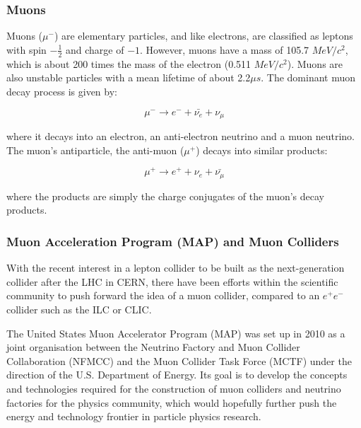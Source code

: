 \cite{Muon:WhitePaper}
\cite{Muon:Geer}
\cite{Muon:Collide}
\cite{Muon:Nature}
\cite{Muon:CERNCourier}
\cite{Muon:ProtonBeam}
\cite{Muon:Feasibility}
\cite{Muon:MICE}
\cite{Muon:PDG}

\subsubsection{Muons}

Muons ($\mu^-$) are elementary particles, and like electrons, are classified as leptons with spin $-\frac{1}{2}$ and charge of $-1$. However, muons have a mass of 105.7 $MeV/c^2$, which is about 200 times the mass of the electron (0.511 $MeV/c^2$). Muons are also unstable particles with a mean lifetime of about 2.2$\mu s$. The dominant muon decay process is given by:

\begin{equation}
    \mu^- \rightarrow e^- + \bar{\nu_e} + \nu_{\mu}
\end{equation}

where it decays into an electron, an anti-electron neutrino and a muon neutrino. The muon's antiparticle, the anti-muon ($\mu^+$) decays into similar products: 

\begin{equation}
    \mu^+ \rightarrow e^+ + \nu_e + \bar{\nu_{\mu}}
\end{equation}    
 
where the products are simply the charge conjugates of the muon's decay products.
 
\subsubsection{Muon Acceleration Program (MAP) and Muon Colliders}

With the recent interest in a lepton collider to be built as the next-generation collider after the LHC in CERN, there have been efforts within the scientific community to push forward the idea of a muon collider, compared to an $e^+ e^-$ collider such as the ILC or CLIC.
 
The United States Muon Accelerator Program (MAP) was set up in 2010 as a joint organisation between the Neutrino Factory and Muon Collider Collaboration (NFMCC) and the Muon Collider Task Force (MCTF) under the direction of the U.S. Department of Energy. Its goal is to develop the concepts and technologies required for the construction of muon colliders and neutrino factories for the physics community, which would hopefully further push the energy and technology frontier in particle physics research.
 
